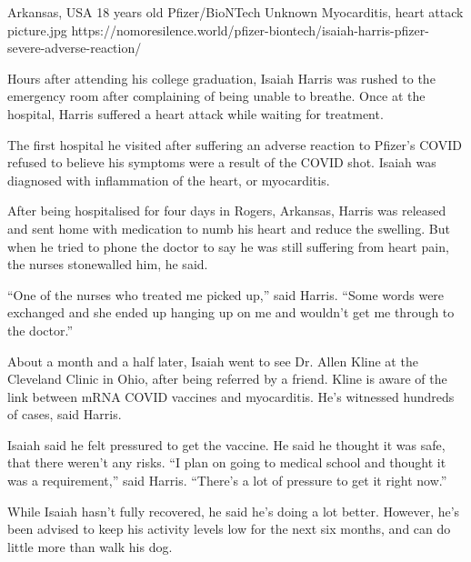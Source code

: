           {Arkansas, USA}
          {18 years old}
          {Pfizer/BioNTech}
          {Unknown}
          {Myocarditis, heart attack}
          {picture.jpg}
          {https://nomoresilence.world/pfizer-biontech/isaiah-harris-pfizer-severe-adverse-reaction/}
          {

Hours after attending his college graduation, Isaiah Harris was rushed to the
emergency room after complaining of being unable to breathe. Once at the
hospital, Harris suffered a heart attack while waiting for treatment.

The first hospital he visited after suffering an adverse reaction to Pfizer’s
COVID refused to believe his symptoms were a result of the COVID shot. Isaiah
was diagnosed with inflammation of the heart, or myocarditis.

After being hospitalised for four days in Rogers, Arkansas, Harris was released
and sent home with medication to numb his heart and reduce the swelling. But
when he tried to phone the doctor to say he was still suffering from heart pain,
the nurses stonewalled him, he said.

“One of the nurses who treated me picked up,” said Harris. “Some words were
exchanged and she ended up hanging up on me and wouldn’t get me through to the
doctor.”

About a month and a half later, Isaiah went to see Dr. Allen Kline at the
Cleveland Clinic in Ohio, after being referred by a friend. Kline is aware of
the link between mRNA COVID vaccines and myocarditis. He’s witnessed hundreds of
cases, said Harris.

Isaiah said he felt pressured to get the vaccine. He said he thought it was
safe, that there weren’t any risks. “I plan on going to medical school and
thought it was a requirement,” said Harris. “There’s a lot of pressure to get it
right now.”

While Isaiah hasn’t fully recovered, he said he’s doing a lot better. However,
he’s been advised to keep his activity levels low for the next six months, and
can do little more than walk his dog.

}
